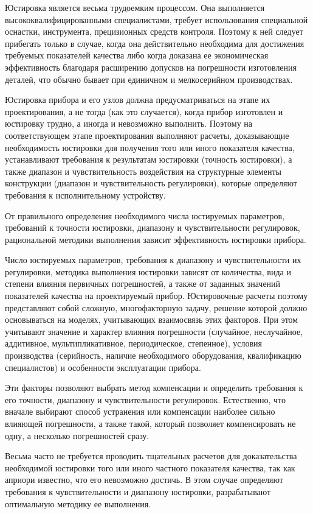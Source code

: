 Юстировка является весьма трудоемким процессом. Она выполняется высококвалифицированными специалистами, требует использования специальной оснастки, инструмента, прецизионных средств контроля. Поэтому к ней следует прибегать только в случае, когда она действительно необходима для достижения требуемых показателей качества либо когда доказана ее экономическая эффективность благодаря расширению допусков на погрешности изготовления деталей, что обычно бывает при единичном и мелкосерийном производствах.

Юстировка прибора и его узлов должна предусматриваться на этапе их проектирования, а не тогда (как это случается), когда прибор изготовлен и юстировку трудно, а иногда и невозможно выполнить. Поэтому на соответствующем этапе проектирования выполняют расчеты, доказывающие необходимость юстировки для получения того или иного показателя качества, устанавливают требования к результатам юстировки (точность юстировки), а также диапазон и чувствительность воздействия на структурные элементы конструкции (диапазон и чувствительность регулировки), которые определяют требования к исполнительному устройству.

От правильного определения необходимого числа юстируемых параметров, требований к точности юстировки, диапазону и чувствительности регулировок, рациональной методики выполнения зависит эффективность юстировки прибора.

Число юстируемых параметров, требования к диапазону и чувствительности их регулировки, методика выполнения юстировки зависят от количества, вида и степени влияния первичных погрешностей, а также от заданных значений показателей качества на проектируемый прибор. Юстировочные расчеты поэтому представляют собой сложную, многофакторную задачу, решение которой должно основываться на моделях, учитывающих взаимосвязь этих факторов.
При этом учитывают значение и характер влияния погрешности (случайное, неслучайное, аддитивное, мультипликативное, периодическое, степенное), условия производства (серийность, наличие необходимого оборудования, квалификацию специалистов) и особенности эксплуатации прибора. 

Эти факторы позволяют выбрать метод компенсации и определить требования к его точности, диапазону и чувствительности регулировок.
Естественно, что вначале выбирают способ устранения или компенсации наиболее сильно влияющей погрешности, а также такой, который позволяет компенсировать не одну, а несколько погрешностей сразу.

Весьма часто не требуется проводить тщательных расчетов для доказательства необходимой юстировки того или иного частного показателя качества, так как априори известно, что его невозможно достичь. В этом случае определяют требования к чувствительности и диапазону юстировки, разрабатывают оптимальную методику ее выполнения.

